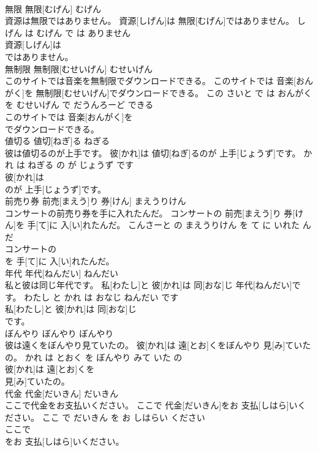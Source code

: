 \documentclass[8pt]{extreport}
\begin{document}
\begin{CJK}{UTF8}{min}
\\	無限	無限[むげん]	むげん	
\\	資源は無限ではありません。	資源[しげん]は 無限[むげん]ではありません。	しげん は むげん で は ありません	
\\	資源[しげん]は
\\	ではありません。			
\\	無制限	無制限[むせいげん]	むせいげん	
\\	このサイトでは音楽を無制限でダウンロードできる。	このサイトでは 音楽[おんがく]を 無制限[むせいげん]でダウンロードできる。	この さいと で は おんがく を むせいげん で だうんろーど できる	
\\	このサイトでは 音楽[おんがく]を
\\	でダウンロードできる。			
\\	値切る	値切[ねぎ]る	ねぎる	
\\	彼は値切るのが上手です。	彼[かれ]は 値切[ねぎ]るのが 上手[じょうず]です。	かれ は ねぎる の が じょうず です	
\\	彼[かれ]は
\\	のが 上手[じょうず]です。			
\\	前売り券	前売[まえう]り 券[けん]	まえうりけん	
\\	コンサートの前売り券を手に入れたんだ。	コンサートの 前売[まえう]り 券[けん]を 手[て]に 入[い]れたんだ。	こんさーと の まえうりけん を て に いれた ん だ	
\\	コンサートの
\\	を 手[て]に 入[い]れたんだ。			
\\	年代	年代[ねんだい]	ねんだい	
\\	私と彼は同じ年代です。	私[わたし]と 彼[かれ]は 同[おな]じ 年代[ねんだい]です。	わたし と かれ は おなじ ねんだい です	
\\	私[わたし]と 彼[かれ]は 同[おな]じ
\\	です。			
\\	ぼんやり	ぼんやり	ぼんやり	
\\	彼は遠くをぼんやり見ていたの。	彼[かれ]は 遠[とお]くをぼんやり 見[み]ていたの。	かれ は とおく を ぼんやり みて いた の	
\\	彼[かれ]は 遠[とお]くを
\\	見[み]ていたの。			
\\	代金	代金[だいきん]	だいきん	
\\	ここで代金をお支払いください。	ここで 代金[だいきん]をお 支払[しはら]いください。	ここ で だいきん を お しはらい ください	
\\	ここで
\\	をお 支払[しはら]いください。			

\end{CJK}
\end{document}
